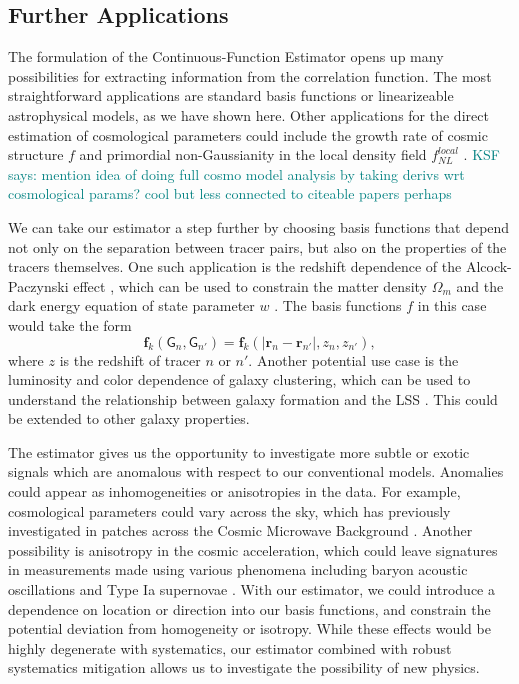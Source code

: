 \documentclass[modern]{aastex62}
\newcommand{\est}{the Continuous-Function Estimator\xspace}
\newcommand{\bld}[1]{\bm{#1}} %
\newcommand{\ff}{\bld{f}}
\newcommand{\GG}[1]{\mathsf{G}_{#1}}
\newcommand{\KSF}[1]{\textcolor{teal}{KSF says: #1}}
\begin{document}
\subsection{Further Applications}

The formulation of \est opens up many possibilities for extracting information from the correlation function.
The most straightforward applications are standard basis functions or linearizeable astrophysical models, as we have shown here.
Other applications for the direct estimation of cosmological parameters could include the growth rate of cosmic structure $f$ \citep{Satpathy2016, Reid2018} and primordial non-Gaussianity in the local density field $f^{local}_{NL}$ \citep{Karagiannis2014}.
\KSF{mention idea of doing full cosmo model analysis by taking derivs wrt cosmological params? cool but less connected to citeable papers perhaps}

We can take our estimator a step further by choosing basis functions that depend not only on the separation between tracer pairs, but also on the properties of the tracers themselves.
One such application is the redshift dependence of the Alcock-Paczynski effect \cite{AlcockPaczynski1979}, which can be used to constrain the matter density $\Omega_m$ and the dark energy equation of state parameter $w$ \citep{Li2016}.
The basis functions $f$ in this case would take the form
\begin{equation}
    \ff_k(\GG{n}, \GG{n'}) = \ff_k(|\bld{r}_n - \bld{r}_{n'}|, z_n, z_{n'}),
\end{equation}
where $z$ is the redshift of tracer $n$ or $n'$.
Another potential use case is the luminosity and color dependence of galaxy clustering, which can be used to understand the relationship between galaxy formation and the LSS \citep{Zehavi2011}.
This could be extended to other galaxy properties.

The estimator gives us the opportunity to investigate more subtle or exotic signals which are anomalous with respect to our conventional models.
Anomalies could appear as inhomogeneities or anisotropies in the data.
For example, cosmological parameters could vary across the sky, which has previously investigated in patches across the Cosmic Microwave Background \citep{MukherjeeWandelt2018}.
Another possibility is anisotropy in the cosmic acceleration, which could leave signatures in measurements made using various phenomena including baryon acoustic oscillations \citep{Faltenbacher2012} and Type Ia supernovae \citep{Colin2019}.
With our estimator, we could introduce a dependence on location or direction into our basis functions, and constrain the potential deviation from homogeneity or isotropy.
While these effects would be highly degenerate with systematics, our estimator combined with robust systematics mitigation allows us to investigate the possibility of new physics.
\end{document}
